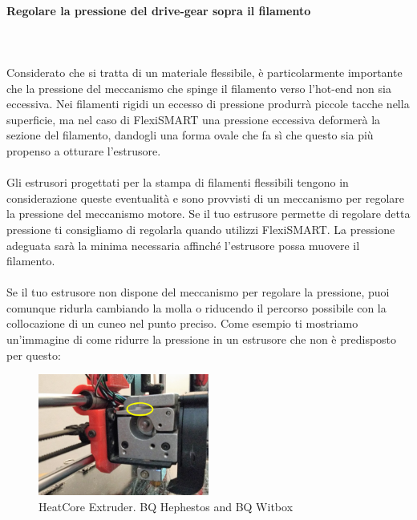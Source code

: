 \documentclass[11pt,a4paper]{article}
\begin{document}
	\paragraph{Regolare la pressione del drive-gear sopra il filamento}\mbox{}\\\\
Considerato che si tratta di un materiale flessibile, è particolarmente importante che la pressione del meccanismo che spinge il filamento verso l'hot-end non sia eccessiva. Nei filamenti rigidi un eccesso di pressione produrrà piccole tacche nella superficie, ma nel caso di FlexiSMART una pressione eccessiva deformerà la sezione del filamento, dandogli una forma ovale che fa sì che questo sia più propenso a otturare l'estrusore.
\\\\
Gli estrusori progettati per la stampa di filamenti flessibili tengono in considerazione queste eventualità e sono provvisti di un meccanismo per regolare la pressione del meccanismo motore. Se il tuo estrusore permette di regolare detta pressione ti consigliamo di regolarla quando utilizzi FlexiSMART. La pressione adeguata sarà la minima necessaria affinché l'estrusore possa muovere il filamento.
\\\\
Se il tuo estrusore non dispone del meccanismo per regolare la pressione, puoi comunque ridurla cambiando la molla o riducendo il percorso possibile con la collocazione di un cuneo nel punto preciso. Come esempio ti mostriamo un'immagine di come ridurre la pressione in un estrusore che non è predisposto per questo:
\begin{figure}[H]
\centering
\includegraphics[width=0.5\textwidth,cfbox=azul_marcos 4pt 0pt]{FOTOS/SOLUCION1}
\caption*{HeatCore Extruder. BQ Hephestos and BQ Witbox}
\end{figure}
\end{document}

